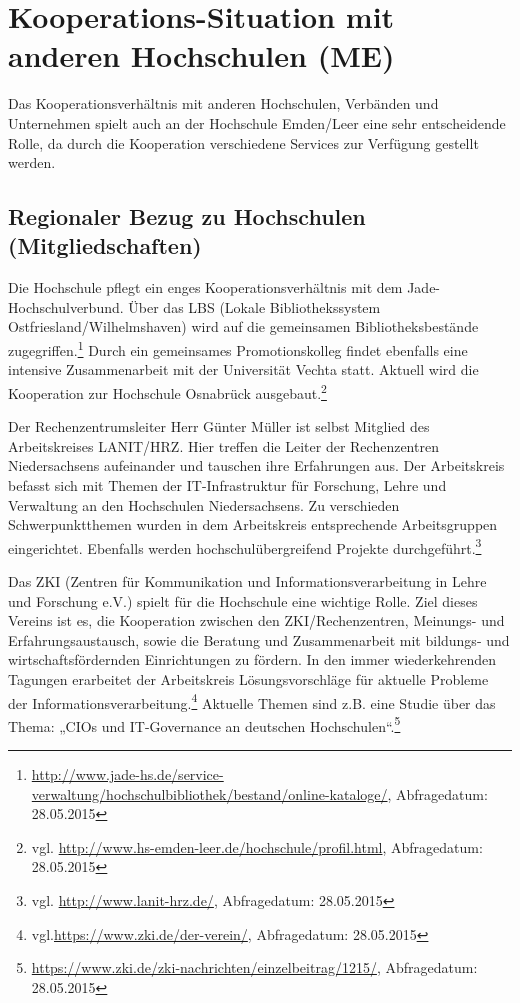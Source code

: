 \section{Kooperations-Situation mit anderen Hochschulen (ME)}
\label{section_kooperations_situation}

Das Kooperationsverhältnis mit anderen Hochschulen, Verbänden und Unternehmen spielt auch an der Hochschule Emden/Leer eine sehr entscheidende Rolle, da durch die Kooperation verschiedene Services zur Verfügung gestellt werden.

\subsection{Regionaler Bezug zu Hochschulen (Mitgliedschaften)}
Die Hochschule pflegt ein enges Kooperationsverhältnis mit dem Jade-Hochschulverbund. Über das LBS (Lokale Bibliothekssystem Ostfriesland/Wilhelmshaven) wird auf die gemeinsamen  Bibliotheksbestände zugegriffen.\footnote{\url{http://www.jade-hs.de/service-verwaltung/hochschulbibliothek/bestand/online-kataloge/}, Abfragedatum: 28.05.2015} Durch ein gemeinsames Promotionskolleg findet ebenfalls eine intensive Zusammenarbeit mit der Universität Vechta statt. Aktuell wird die Kooperation zur Hochschule Osnabrück ausgebaut.\footnote{vgl. \url{http://www.hs-emden-leer.de/hochschule/profil.html}, Abfragedatum: 28.05.2015}

Der Rechenzentrumsleiter Herr Günter Müller ist selbst Mitglied des Arbeitskreises LANIT/HRZ. Hier treffen die Leiter der Rechenzentren Niedersachsens aufeinander und tauschen ihre Erfahrungen aus. Der Arbeitskreis befasst sich mit Themen der IT-Infrastruktur für Forschung, Lehre und Verwaltung an den Hochschulen Niedersachsens. Zu verschieden Schwerpunktthemen wurden in dem Arbeitskreis entsprechende Arbeitsgruppen eingerichtet.  Ebenfalls werden hochschulübergreifend Projekte durchgeführt.\footnote{vgl. \url{http://www.lanit-hrz.de/}, Abfragedatum: 28.05.2015}

Das ZKI (Zentren für Kommunikation und Informationsverarbeitung in Lehre und Forschung e.V.) spielt für die Hochschule eine wichtige Rolle. Ziel dieses Vereins ist es, die Kooperation zwischen den ZKI/Rechenzentren, Meinungs- und Erfahrungsaustausch, sowie die Beratung und Zusammenarbeit mit bildungs- und wirtschaftsfördernden Einrichtungen zu fördern. In den immer wiederkehrenden Tagungen erarbeitet der Arbeitskreis Lösungsvorschläge für aktuelle Probleme der Informationsverarbeitung.\footnote{vgl.\url{https://www.zki.de/der-verein/}, Abfragedatum: 28.05.2015} Aktuelle Themen sind z.B. eine Studie über das Thema: „CIOs und IT-Governance an deutschen Hochschulen“.\footnote{\url{https://www.zki.de/zki-nachrichten/einzelbeitrag/1215/}, Abfragedatum: 28.05.2015}

